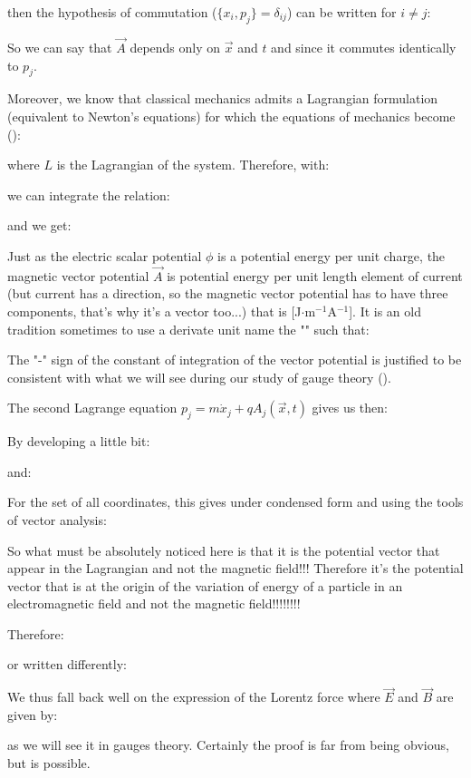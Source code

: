 	then the hypothesis of commutation ($\{x_i,p_j\}=\delta_{ij}$)  can be written for $i\neq j$:
	
	So we can say that $\vec{A}$ depends only on $\vec{x}$ and $t$ and since it commutes identically to $p_j$.
	
	Moreover, we know that classical mechanics admits a Lagrangian formulation (equivalent to Newton's equations) for which the equations of mechanics become ():
	
	where $L$ is the Lagrangian of the system. Therefore, with:
	
	we can integrate the relation:
	
	and we get:
	
	 Just as the electric scalar potential $\phi$ is a potential energy per unit charge, the magnetic vector potential $\vec{A}$ is potential energy per unit length element of current (but current has a direction, so the magnetic vector potential has to have three components, that's why it's a vector too...) that is [J$\cdot$m$^{-1}$A$^{-1}$]. It is an old tradition sometimes to use a derivate unit name the "" such that:
	 
	The "-" sign of the constant of integration of the vector potential is justified to be consistent with what we will see during our study of gauge theory ().

	The second Lagrange equation $p_j=m\dot{x}_j+qA_j(\vec{x},t)$ gives us then:
	
	By developing a little bit:
	
	and:
	
	For the set of all coordinates, this gives under condensed form and using the tools of vector analysis:
	
	So what must be absolutely noticed here is that it is the potential vector that appear in the Lagrangian and not the magnetic field!!! Therefore it's the potential vector that is at the origin of the variation of energy of a particle in an electromagnetic field and not the magnetic field!!!!!!!!
	
	Therefore:
	
	or written differently:
	
	We thus fall back well on the expression of the Lorentz force where $\vec{E}$ and $\vec{B}$ are given by:
	
	as we will see it in gauges theory. Certainly the proof is far from being obvious, but is possible.
	
